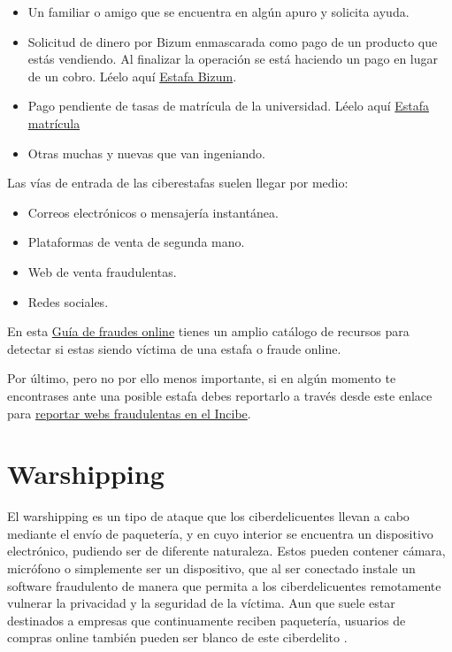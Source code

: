 \documentclass[
  a4paper,
  openany]{book}
\begin{document}
\begin{itemize}
\item
  Un familiar o amigo que se encuentra en algún apuro y solicita ayuda.
\item
  Solicitud de dinero por Bizum enmascarada como pago de un producto que estás vendiendo. Al finalizar la operación se está haciendo un pago en lugar de un cobro. Léelo aquí \href{https://bizum.es/blog/estafa-bizum/}{Estafa Bizum}.
\item
  Pago pendiente de tasas de matrícula de la universidad. Léelo aquí \href{https://www.incibe.es/ciudadania/avisos/si-eres-universitario-no-caigas-en-este-engano-sobre-el-pago-de-tu-matricula}{Estafa matrícula}
\item
  Otras muchas y nuevas que van ingeniando.
\end{itemize}

Las vías de entrada de las ciberestafas suelen llegar por medio:

\begin{itemize}
\item
  Correos electrónicos o mensajería instantánea.
\item
  Plataformas de venta de segunda mano.
\item
  Web de venta fraudulentas.
\item
  Redes sociales.
\end{itemize}

En esta \href{https://www.osi.es/es/guia-fraudes-online}{Guía de fraudes online} tienes un amplio catálogo de recursos para detectar si estas siendo víctima de una estafa o fraude online.

Por último, pero no por ello menos importante, si en algún momento te encontrases ante una posible estafa debes reportarlo a través desde este enlace para \href{https://www.incibe.es/protege-tu-empresa/reporte-fraude}{reportar webs fraudulentas en el Incibe}.

\hypertarget{warshipping}{%
\section{Warshipping}\label{warshipping}}

El warshipping es un tipo de ataque que los ciberdelicuentes llevan a cabo mediante el envío de paquetería, y en cuyo interior se encuentra un dispositivo electrónico, pudiendo ser de diferente naturaleza. Estos pueden contener cámara, micrófono o simplemente ser un dispositivo, que al ser conectado instale un software fraudulento de manera que permita a los ciberdelicuentes remotamente vulnerar la privacidad y la seguridad de la víctima. Aun que suele estar destinados a empresas que continuamente reciben paquetería, usuarios de compras online también pueden ser blanco de este ciberdelito \citep{INCI-warshipping}.
\end{document}
